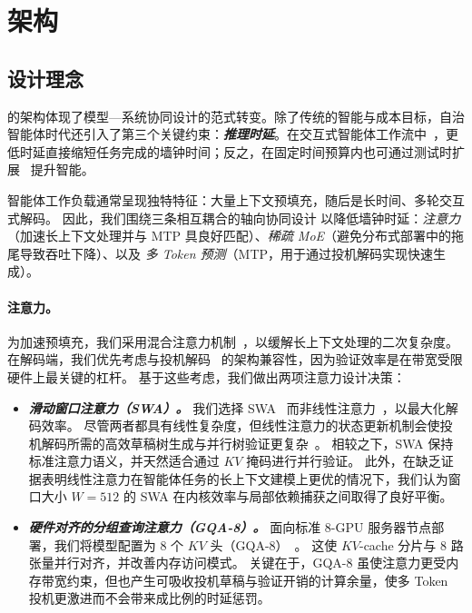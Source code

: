 \section{架构}
\label{sec:arch}


\subsection{设计理念}

\ourmodel 的架构体现了模型—系统协同设计的范式转变。除了传统的智能与成本目标，自治智能体时代还引入了第三个关键约束：\textbf{\textit{推理时延}}。在交互式智能体工作流中~\cite{anthropic_agent_workflow,codex_agent_workflow}，更低时延直接缩短任务完成的墙钟时间；反之，在固定时间预算内也可通过测试时扩展~\cite{snell2025scaling,muennighoff2025s1,yang2025multiverse,hu2026pacorelearningscaletesttime} 提升智能。

智能体工作负载通常呈现独特特征：大量上下文预填充，随后是长时间、多轮交互式解码。
因此，我们围绕三条相互耦合的轴向协同设计 \ourmodel 以降低墙钟时延：\emph{注意力}（加速长上下文处理并与 MTP 具良好匹配）、\emph{稀疏 MoE}（避免分布式部署中的拖尾导致吞吐下降）、以及 \emph{多 Token 预测}（MTP，用于通过投机解码实现快速生成）。

\paragraph{注意力。}
为加速预填充，我们采用混合注意力机制~\cite{Beltagy2020Longformer,gemmateam2025gemma3technicalreport,openai2025gptoss120bgptoss20bmodel}，以缓解长上下文处理的二次复杂度。
在解码端，我们优先考虑与投机解码~\cite{10.5555/3618408.3619203} 的架构兼容性，因为验证效率是在带宽受限硬件上最关键的杠杆。
基于这些考虑，我们做出两项注意力设计决策：
\begin{itemize}
    \item \textbf{\textit{滑动窗口注意力（SWA）。}}
我们选择 SWA~\cite{DBLP:journals/corr/abs-1904-10509} 而非线性注意力~\cite{10.5555/3524938.3525416,schlag2021linear}，以最大化解码效率。
尽管两者都具有线性复杂度，但线性注意力的状态更新机制会使投机解码所需的高效草稿树生成与并行树验证更复杂~\cite{wang2025opt,xiong2025dyspec,10.5555/3692070.3694435}。
相较之下，SWA 保持标准注意力语义，并天然适合通过 $KV$ 掩码进行并行验证。
此外，在缺乏证据表明线性注意力在智能体任务的长上下文建模上更优的情况下，我们认为窗口大小 $W{=}512$ 的 SWA 在内核效率与局部依赖捕获之间取得了良好平衡。

    \item \textbf{\textit{硬件对齐的分组查询注意力（GQA-8）。}}
面向标准 8-GPU 服务器节点部署，我们将模型配置为 8 个 $KV$ 头（GQA-8）~\cite{ainslie-etal-2023-gqa}。
这使 $KV$-cache 分片与 8 路张量并行对齐，并改善内存访问模式。
关键在于，GQA-8 虽使注意力更受内存带宽约束，但也产生可吸收投机草稿与验证开销的计算余量，使多 Token 投机更激进而不会带来成比例的时延惩罚。
\end{itemize}

